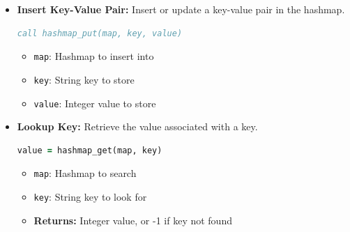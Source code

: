\begin{enumerate}
\begin{enumerate}
\begin{itemize}
\begin{itemize}
                            \item \textbf{(Optional)} \texttt{initial\_size}: Initial size
                                  of the hashmap
                          \end{itemize}
                          
                    \item \textbf{Insert Key-Value Pair:} Insert or update a key-value pair in the hashmap. 
                          \begin{lstlisting}[language=Fortran]
call hashmap_put(map, key, value)
                    \end{lstlisting}
                    \begin{itemize}
                        \item \texttt{map}: Hashmap to insert into
                              
                        \item \texttt{key}: String key to store
                              
                        \item \texttt{value}: Integer value to store
                    \end{itemize}
                    
                    \item \textbf{Lookup Key:} Retrieve the value associated with a key.
                          \begin{lstlisting}[language=Fortran]
value = hashmap_get(map, key)
                          \end{lstlisting}
                          \begin{itemize}
                            \item \texttt{map}: Hashmap to search
                                  
                            \item \texttt{key}: String key to look for
                                  
                            \item \textbf{Returns:} Integer value, or -1 if key not found
                          \end{itemize}
                          

\end{itemize}
\end{enumerate}
\end{enumerate}
